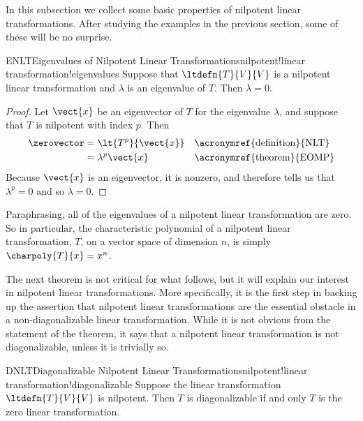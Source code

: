%
%
In this subsection we collect some basic properties of nilpotent linear transformations.  After studying the examples in the previous section, some of these will be no surprise.
%
\begin{theorem}{ENLT}{Eigenvalues of Nilpotent Linear Transformations}{nilpotent!linear transformation!eigenvalues}
Suppose that $\ltdefn{T}{V}{V}$ is a nilpotent linear transformation and $\lambda$ is an eigenvalue of $T$.  Then $\lambda=0$.
\end{theorem}
%
\begin{proof}
Let $\vect{x}$ be an eigenvector of $T$ for the eigenvalue $\lambda$, and suppose that $T$ is nilpotent with index $p$.  Then
%
\begin{align*}
\zerovector
&=\lt{T^p}{\vect{x}}&&\text{\acronymref{definition}{NLT}}\\
&=\lambda^p\vect{x}&&\text{\acronymref{theorem}{EOMP}}
\end{align*}
%
Because $\vect{x}$ is an eigenvector, it is nonzero, and therefore  tells us that $\lambda^p=0$ and so $\lambda=0$.
%
\end{proof}
%
Paraphrasing, all of the eigenvalues of a nilpotent linear transformation are zero.  So in particular, the characteristic polynomial of a nilpotent linear transformation, $T$, on a vector space of dimension $n$, is simply $\charpoly{T}{x}=x^n$.\par
%
%
The next theorem is not critical for what follows, but it will explain our interest in nilpotent linear transformations.  More specifically, it is the first step in backing up the assertion that nilpotent linear transformations are the essential obstacle in a non-diagonalizable linear transformation.  While it is not obvious from the statement of the theorem, it says that a nilpotent linear transformation is not diagonalizable, unless it is trivially so.
%
\begin{theorem}{DNLT}{Diagonalizable Nilpotent Linear Transformations}{nilpotent!linear transformation!diagonalizable}
Suppose the linear transformation $\ltdefn{T}{V}{V}$ is nilpotent.   Then $T$ is diagonalizable if and only $T$ is the zero linear transformation.
\end{theorem}
%
